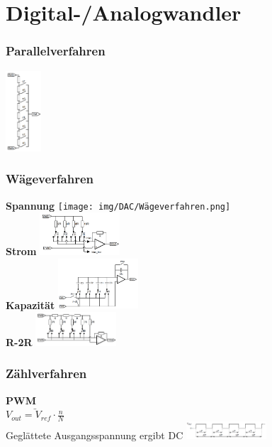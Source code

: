 \documentclass[margin=normal]{tex/hsrzf}
\begin{document}
\section{Digital-/Analogwandler}

\begin{multicols}{5}


  \subsubsection*{Parallelverfahren}
  \includegraphics[height = 3cm]{img/DAC/Parallelverfahren.png}

  \subsubsection*{Wägeverfahren}
  \scriptsize
  \textbf{Spannung}
  \texttt{[image: img/DAC/Wägeverfahren.png]}
  \\\textbf{Strom}
  \includegraphics[width = 3cm]{img/DAC/Wägeverfahren_Ströme.png}
  \\\textbf{Kapazität}
  \includegraphics[width = 3cm]{img/DAC/C-DAC.png}
  \\\textbf{R-2R}
  \includegraphics[width = 3cm]{img/DAC/R-2R-DAC.png}

  \subsubsection*{Zählverfahren}
  \scriptsize
  \textbf{PWM} \\
  \tiny{
    $\bar{V_{out} = V_{ref} \cdot \frac{n}{N}}$
    \\ Geglättete Ausgangsspannung ergibt DC}
  \includegraphics[width = 3cm]{img/DAC/PWM.png}

\end{multicols}
\end{document}
